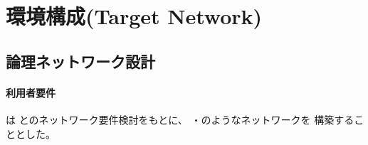  \section{環境構成(Target Network)}

  \subsection{論理ネットワーク設計}

  \paragraph{利用者要件}
\tj は \yo とのネットワーク要件検討をもとに、
・のようなネットワークを
構築することとした。


